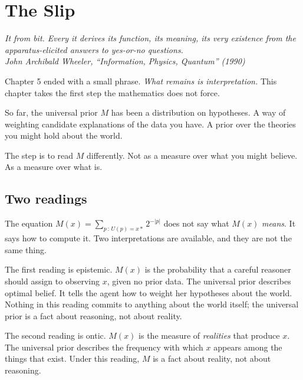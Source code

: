 \chapter{The Slip}

\vspace{1em}
\hfill
\begin{minipage}[c]{0.55\textwidth}
\raggedleft
\small\itshape
It from bit. Every it derives its function, its meaning, its very existence from the apparatus-elicited answers to yes-or-no questions.\\[0.5em]
\upshape\footnotesize John Archibald Wheeler, ``Information, Physics, Quantum'' (1990)
\end{minipage}%
\hspace{0.5em}
\begin{minipage}[c]{0.12\textwidth}
\end{minipage}
\vspace{1.5em}

\noindent Chapter 5 ended with a small phrase. \emph{What remains is interpretation.} This chapter takes the first step the mathematics does not force.

So far, the universal prior $M$ has been a distribution on hypotheses. A way of weighting candidate explanations of the data you have. A prior over the theories you might hold about the world.

The step is to read $M$ differently. Not as a measure over what you might believe. As a measure over what is.

\section*{Two readings}

The equation $M(x) = \sum_{p\,:\,U(p) = x*} 2^{-|p|}$ does not say what $M(x)$ \emph{means}. It says how to compute it. Two interpretations are available, and they are not the same thing.

The first reading is epistemic. $M(x)$ is the probability that a careful reasoner should assign to observing $x$, given no prior data. The universal prior describes optimal belief. It tells the agent how to weight her hypotheses about the world. Nothing in this reading commits to anything about the world itself; the universal prior is a fact about reasoning, not about reality.

The second reading is ontic. $M(x)$ is the measure of \emph{realities} that produce $x$. The universal prior describes the frequency with which $x$ appears among the things that exist. Under this reading, $M$ is a fact about reality, not about reasoning.

